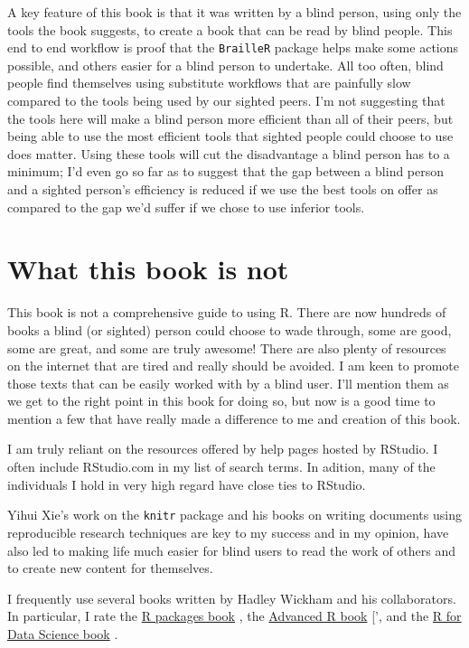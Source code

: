 \documentclass[
]{book}
\begin{document}
A key feature of this book is that it was written by a blind person, using only the tools the book suggests, to create a book that can be read by blind people. This end to end workflow is proof that the \texttt{BrailleR} package helps make some actions possible, and others easier for a blind person to undertake. All too often, blind people find themselves using substitute workflows that are painfully slow compared to the tools being used by our sighted peers. I'm not suggesting that the tools here will make a blind person more efficient than all of their peers, but being able to use the most efficient tools that sighted people could choose to use does matter. Using these tools will cut the disadvantage a blind person has to a minimum; I'd even go so far as to suggest that the gap between a blind person and a sighted person's efficiency is reduced if we use the best tools on offer as compared to the gap we'd suffer if we chose to use inferior tools.

\hypertarget{what-this-book-is-not}{%
\section{What this book is not}\label{what-this-book-is-not}}

This book is not a comprehensive guide to using R. There are now hundreds of books a blind (or sighted) person could choose to wade through, some are good, some are great, and some are truly awesome! There are also plenty of resources on the internet that are tired and really should be avoided. I am keen to promote those texts that can be easily worked with by a blind user. I'll mention them as we get to the right point in this book for doing so, but now is a good time to mention a few that have really made a difference to me and creation of this book.

I am truly reliant on the resources offered by help pages hosted by RStudio. I often include RStudio.com in my list of search terms. In adition, many of the individuals I hold in very high regard have close ties to RStudio.

Yihui Xie's work on the \texttt{knitr} package \citep{Rpkg-knitr}
and his books on writing documents using reproducible research techniques \citep{Xie2015}
are key to my success and in my opinion, have also led to making life much easier for blind users to read the work of others and to create new content for themselves.

I frequently use several books written by Hadley Wickham and his collaborators. In particular, I rate the \href{http://r-pkgs.had.co.nz/}{R packages book} \citep{Wickham2015RPackages}, the \href{https://adv-r.hadley.nz}{Advanced R book} {[}\citet{Wickham2014Advanced}', and the \href{http://r4ds.had.co.nz/}{R for Data Science book} \citep{GrolemundWickham2016}.
\end{document}
